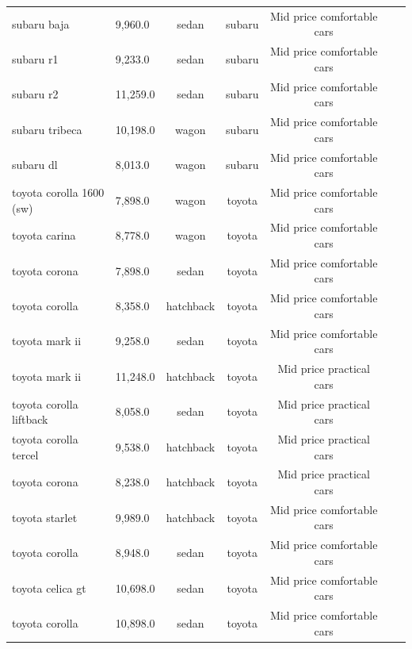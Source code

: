 \documentclass{article}
\begin{document}
\begin{longtable}{llccccl}
    subaru baja              & 9,960.0             & sedan            & subaru         & Mid price comfortable cars \\
    subaru r1                & 9,233.0             & sedan            & subaru         & Mid price comfortable cars \\
    subaru r2                & 11,259.0            & sedan            & subaru         & Mid price comfortable cars \\
    subaru tribeca           & 10,198.0            & wagon            & subaru         & Mid price comfortable cars \\
    subaru dl                & 8,013.0             & wagon            & subaru         & Mid price comfortable cars \\
    toyota corolla 1600 (sw) & 7,898.0             & wagon            & toyota         & Mid price comfortable cars \\
    toyota carina            & 8,778.0             & wagon            & toyota         & Mid price comfortable cars \\
    toyota corona            & 7,898.0             & sedan            & toyota         & Mid price comfortable cars \\
    toyota corolla           & 8,358.0             & hatchback        & toyota         & Mid price comfortable cars \\
    toyota mark ii           & 9,258.0             & sedan            & toyota         & Mid price comfortable cars \\
    toyota mark ii           & 11,248.0            & hatchback        & toyota         & Mid price practical cars   \\
    toyota corolla liftback  & 8,058.0             & sedan            & toyota         & Mid price practical cars   \\
    toyota corolla tercel    & 9,538.0             & hatchback        & toyota         & Mid price practical cars   \\
    toyota corona            & 8,238.0             & hatchback        & toyota         & Mid price practical cars   \\
    toyota starlet           & 9,989.0             & hatchback        & toyota         & Mid price comfortable cars \\
    toyota corolla           & 8,948.0             & sedan            & toyota         & Mid price comfortable cars \\
    toyota celica gt         & 10,698.0            & sedan            & toyota         & Mid price comfortable cars \\
    toyota corolla           & 10,898.0            & sedan            & toyota         & Mid price comfortable cars \\
\end{longtable}
\end{document}
